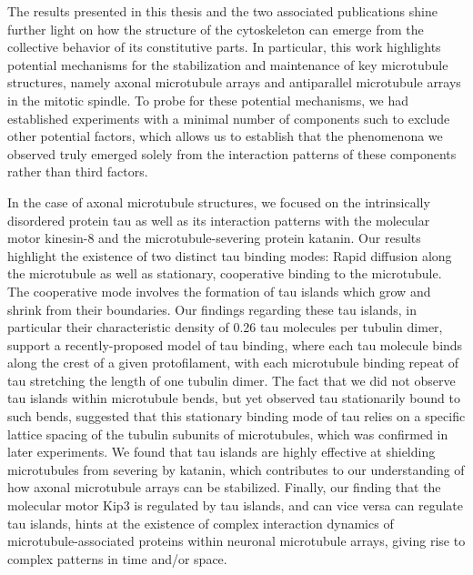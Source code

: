 The results presented in this thesis and the two associated publications  shine further light on how the structure of the cytoskeleton can emerge from the collective behavior of its constitutive parts. In particular, this work highlights potential mechanisms for the stabilization and maintenance of key microtubule structures, namely axonal microtubule arrays and antiparallel microtubule arrays in the mitotic spindle. To probe for these potential mechanisms, we had established experiments with a minimal number of components such to exclude other potential factors, which allows us to establish that the phenomenona we observed truly emerged solely from the interaction patterns of these components rather than third factors.\par

In the case of axonal microtubule structures, we focused on the intrinsically disordered protein tau as well as its interaction patterns with the molecular motor kinesin-8 and the microtubule-severing protein katanin. Our results highlight the existence of two distinct tau binding modes: Rapid diffusion along the microtubule as well as stationary, cooperative binding to the microtubule. The cooperative mode involves the formation of tau islands which grow and shrink from their boundaries. Our findings regarding these tau islands, in particular their characteristic density of 0.26 tau molecules per tubulin dimer, support a recently-proposed model of tau binding, where each tau molecule binds along the crest of a given protofilament, with each microtubule binding repeat of tau stretching the length of one tubulin dimer. The fact that we did not observe tau islands within microtubule bends, but yet observed tau stationarily bound to such bends, suggested that this stationary binding mode of tau relies on a specific lattice spacing of the tubulin subunits of microtubules, which was confirmed in later experiments. We found that tau islands are highly effective at shielding microtubules from severing by katanin, which contributes to our understanding of how axonal microtubule arrays can be stabilized. Finally, our finding that the molecular motor Kip3 is regulated by tau islands, and can vice versa can regulate tau islands, hints at the existence of complex interaction dynamics of microtubule-associated proteins within neuronal microtubule arrays, giving rise to complex patterns in time and/or space.\par

